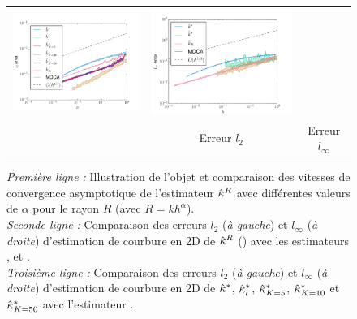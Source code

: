 \begin{figure}[ht]
\begin{center}
\begin{tabular}{@{}l c c @{}}
      \includegraphics[width=7cm]{graphs/Ellipse_PF_L2} &
      \includegraphics[width=7cm]{graphs/Ellipse_PF_Loo}
      \\
      &
      Erreur $l_2$ &
      Erreur $l_\infty$
    \end{tabular}
    \caption[Évaluation expérimentale sur l'objet \Ellipse.]{
      \emph{Première ligne :} Illustration de l'objet \Ellipse et comparaison
      des vitesses de convergence asymptotique de l'estimateur $\hat{\kappa}^{R}$ avec
      différentes valeurs de $\alpha$ pour le rayon $R$ (avec $R=kh^\alpha$).
      \\
      \emph{Seconde ligne :} Comparaison des erreurs $l_2$ (\emph{à gauche}) et
      $l_\infty$ (\emph{à droite}) d'estimation de courbure en 2D de $\hat{\kappa}^{R}$
      (\II) avec les estimateurs \BC \cite{Esbelin2011}, \MDSS
      \cite{Coeurjolly2001,deVieilleville2007} et \MDCA \cite{Roussillon2011}.
      \\
      \emph{Troisième ligne :} Comparaison des erreurs $l_2$ (\emph{à gauche})
      et $l_\infty$ (\emph{à droite}) d'estimation de courbure en 2D de $\hat{\kappa}^{*}$,
      $\hat{\kappa}^{*}_{l}$, $\hat{\kappa}^{*}_{K=5}$, $\hat{\kappa}^{*}_{K=10}$ et $\hat{\kappa}^{*}_{K=50}$ avec
      l'estimateur \MDCA \cite{Roussillon2011}.
      }
      \label{fig:curv-experiments-ellipse}
  \end{center}
\end{figure}

